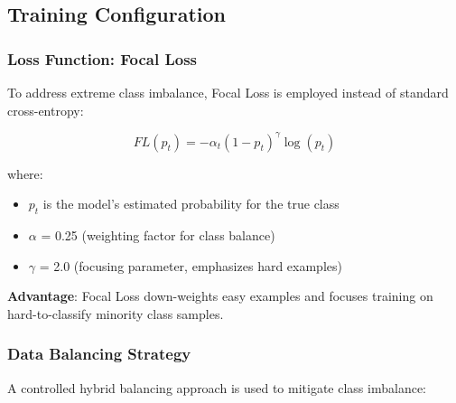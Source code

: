 \documentclass[12pt,a4paper]{article}
\begin{document}
\subsection{Training Configuration}

\subsubsection{Loss Function: Focal Loss}

To address extreme class imbalance, Focal Loss is employed instead of standard cross-entropy:

\begin{equation}
FL(p_t) = -\alpha_t (1 - p_t)^\gamma \log(p_t)
\end{equation}

where:
\begin{itemize}
    \item $p_t$ is the model's estimated probability for the true class
    \item $\alpha$ = 0.25 (weighting factor for class balance)
    \item $\gamma$ = 2.0 (focusing parameter, emphasizes hard examples)
\end{itemize}

\textbf{Advantage}: Focal Loss down-weights easy examples and focuses training on hard-to-classify minority class samples.

\subsubsection{Data Balancing Strategy}

A controlled hybrid balancing approach is used to mitigate class imbalance:
\end{document}
